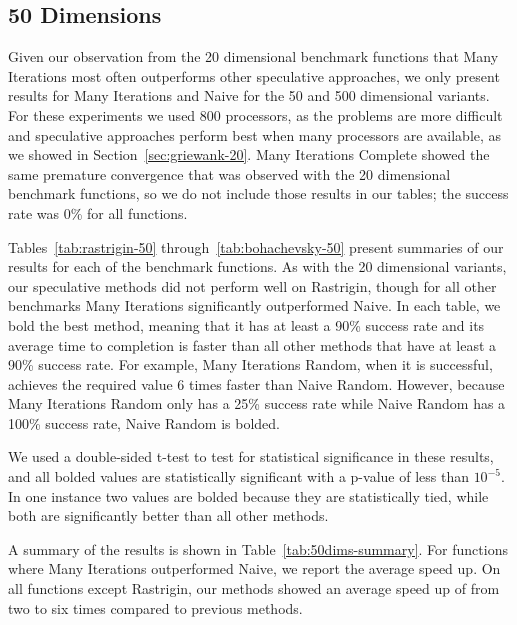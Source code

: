 \documentclass[smallcondensed]{svjour3}
\renewcommand{\sec}[1]{Section~\ref{sec:#1}}
\newcommand{\tabref}[1]{Table~\ref{tab:#1}}
\begin{document}
\subsection{50 Dimensions}
\label{sec:50dims}

Given our observation from the 20 dimensional benchmark functions that Many
Iterations most often outperforms other speculative approaches, we only present
results for Many Iterations and Naive for the 50 and 500 dimensional
variants.  For these experiments we used 800 processors, as the problems are
more difficult and speculative approaches perform best when many processors are
available, as we showed in \sec{griewank-20}.  Many Iterations Complete showed
the same premature convergence that was observed with the 20 dimensional
benchmark functions, so we do not include those results in our tables; the
success rate was 0\% for all functions.

Tables~\ref{tab:rastrigin-50} through~\ref{tab:bohachevsky-50} present
summaries of our results for each of the benchmark functions. As with the 20
dimensional variants, our speculative methods did not perform well on
Rastrigin, though for all other benchmarks Many Iterations significantly
outperformed Naive.  In each table, we bold the best method, meaning that it
has at least a 90\% success rate and its average time to completion is faster
than all other methods that have at least a 90\% success rate.  For example,
Many Iterations Random, when it is successful, achieves the required value 6
times faster than Naive Random.  However, because Many Iterations Random only
has a 25\% success rate while Naive Random has a 100\% success rate, Naive
Random is bolded.

We used a double-sided t-test to test for statistical significance in these
results, and all bolded values are statistically significant with a p-value of
less than $10^{-5}$.  In one instance two values are bolded because they are
statistically tied, while both are significantly better than all other methods.

A summary of the results is shown in \tabref{50dims-summary}.  For functions
where Many Iterations outperformed Naive, we report the average speed up.  On
all functions except Rastrigin, our methods showed an average speed up of from
two to six times compared to previous methods.
\end{document}
